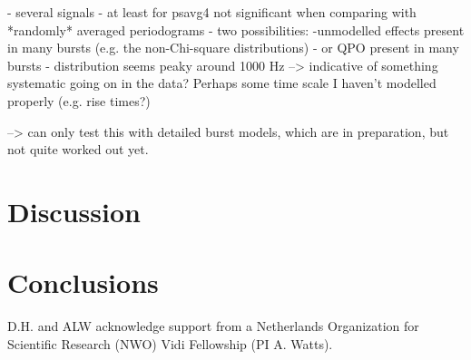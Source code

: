 \documentclass[numberedappendix]{emulateapj}
\begin{document}
- several signals
- at least for psavg4 not significant when comparing with *randomly* averaged periodograms
- two possibilities: -unmodelled effects present in many bursts (e.g. the non-Chi-square distributions)
- or QPO present in many bursts
- distribution seems peaky around 1000 Hz --> indicative of something systematic going on in the data? Perhaps some time scale I haven't modelled properly (e.g. rise times?)

--> can only test this with detailed burst models, which are in preparation, but not quite worked out yet. 


\section{Discussion}
\label{sec:discussion}

\section{Conclusions}


\acknowledgments
D.H. and ALW acknowledge support from a Netherlands Organization for Scientific Research (NWO) Vidi Fellowship (PI A. Watts).  




\end{document}
